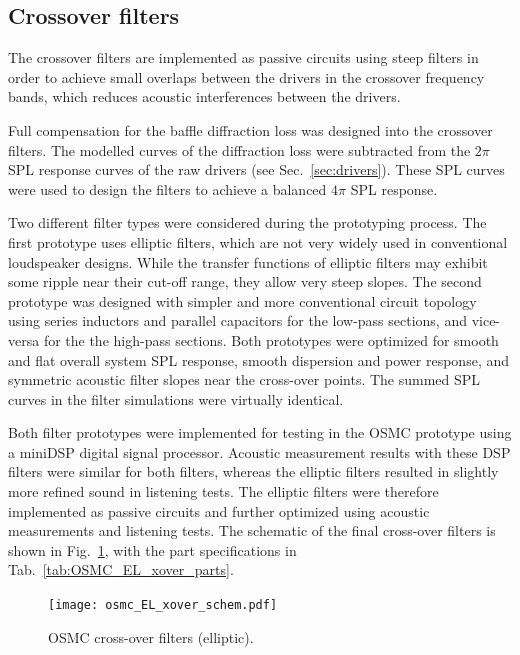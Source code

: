 \documentclass[12pt,a4paper]{article}
\providecommand{\figr}[1]{Fig.~\ref{fig:#1}}
\providecommand{\figlabel}[1]{\label{fig:#1}}
\providecommand{\tabl}[1]{Tab.~\ref{tab:#1}}
\providecommand{\sectn}[1]{Sec.~\ref{sec:#1}}
\providecommand{\seclabel}[1]{\label{sec:#1}}
\begin{document}
\subsection{Crossover filters}\seclabel{crossover_filters}

The crossover filters are implemented as passive circuits using steep filters in order to achieve small overlaps between the drivers in the crossover frequency bands, which reduces acoustic interferences between the drivers.

Full compensation for the baffle diffraction loss was designed into the crossover filters. The modelled curves of the diffraction loss were subtracted from the $2\pi$ SPL response curves of the raw drivers (see \sectn{drivers}). These SPL curves were used to design the filters to achieve a balanced $4\pi$ SPL response.\par

Two different filter types were considered during the prototyping process.\cite{osmc_p685} The first prototype uses elliptic filters, which are not very widely used in conventional loudspeaker designs. While the transfer functions of elliptic filters may exhibit some ripple near their cut-off range, they allow very steep slopes. The second prototype was designed with simpler and more conventional circuit topology using series inductors and parallel capacitors for the low-pass sections, and vice-versa for the the high-pass sections. Both prototypes were optimized for smooth and flat overall system SPL response, smooth dispersion and power response, and symmetric acoustic filter slopes near the cross-over points. The summed SPL curves in the filter simulations were virtually identical.

Both filter prototypes were implemented for testing in the OSMC prototype using a miniDSP digital signal processor. Acoustic measurement results with these DSP filters were similar for both filters, whereas the elliptic filters resulted in slightly more refined sound in listening tests\cite{osmc_p708}. The elliptic filters were therefore implemented as passive circuits and further optimized using acoustic measurements and listening tests. The schematic of the final cross-over filters is shown in \figr{osmc_EL_xover_schem}, with the part specifications in \tabl{OSMC_EL_xover_parts}.

\begin{figure}[p]
	\centering
	\texttt{[image: osmc\_EL\_xover\_schem.pdf]}
	\caption{OSMC cross-over filters (elliptic).}
	\figlabel{osmc_EL_xover_schem}
\end{figure}
\end{document}
